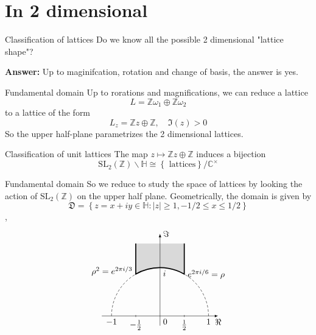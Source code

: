 \documentclass[pdf]{beamer}
\begin{document}
\section{In 2 dimensional}
\begin{frame}{Classification of lattices}
    Do we know all the possible 2 dimensional "lattice shape"?\vspace{3em}

    \pause
    \textbf{Answer:} Up to maginifcation, rotation and change of basis, the answer is yes.
\end{frame}
\begin{frame}{Fundamental domain}
    Up to rorations and magnifications, we can reduce a lattice
    \[L = \mathbb{Z}\omega_1 \oplus \mathbb{Z}\omega_2\]
    to a lattice of the form
    \[L_z = \mathbb{Z}z\oplus\mathbb{Z}, \quad \Im(z)>0\]
    So the upper half-plane parametrizes the 2 dimensional lattices.
    \begin{block}{Classification of unit lattices}
        The map $z \mapsto \mathbb{Z}z\oplus\mathbb{Z}$ induces a bijection
        \[\text{SL}_2(\mathbb{Z}) \backslash\mathbb{H} \cong \left\lbrace \text{ lattices}\right\rbrace/\mathbb{C^\times}\]
    \end{block}

\end{frame}
\begin{frame}{Fundamental domain}
    So we reduce to study the space of lattices by looking the action of $\text{SL}_2(\mathbb{Z})$ on the upper half plane. Geometrically, the domain is given by
    \[\mathfrak{D} = \left\lbrace z=x+iy \in \mathbb{H}: |z| \ge 1,-1/2 \le x \le 1/2 \right\rbrace \],
    \pause
    \[
        \begin{tikzpicture}[scale=2]
            \draw[densely dashed] (1,0) arc (0:60:1) (-1,0) arc (180:120:1);
            \draw[very thick, fill=gray!30] (.5,1.5) --node[right, pos=1]{$e^{2\pi i/6}=\rho$} (60:1) arc (60:120:1)
            --node[left, pos=.1]{$\rho^2=e^{2\pi i/3}$} (-.5,1.5);
            \draw[-latex] (-1.2,0) -- (1.2,0)node[below]{$\Re$};
            \draw[-latex] (0,-.2) -- (0,1.7)node[right]{$\Im$};
            \path(-1,0) --node[below, pos=0]{$-1$}node[below right, pos=.5]{0}node[below, pos=1]{1} (1,0)
            (0,1)node[below right]{$i$};
            \draw(-.5,.02)--(-.5,-.02)node[below]{$-\frac{1}{2}$}(.5,.02)--(.5,-.02)node[below]{$\frac{1}{2}$};
        \end{tikzpicture}\]
\end{frame}
\end{document}
